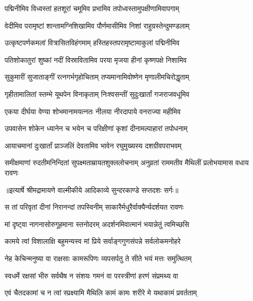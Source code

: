 \twolineshloka
{पद्मिनीमिव विध्वस्तां हतशूरां चमूमिव}
{प्रभामिव तपोध्वस्तामुपक्षीणामिवापगाम्} %

\twolineshloka
{वेदीमिव परामृष्टां शान्तामग्निशिखामिव}
{पौर्णमासीमिव निशां राहुग्रस्तेन्दुमण्डलाम्} %

\twolineshloka
{उत्कृष्टपर्णकमलां वित्रासितविहंगमाम्}
{हस्तिहस्तपरामृष्टामाकुलां पद्मिनीमिव} %

\twolineshloka
{पतिशोकातुरां शुष्कां नदीं विस्रावितामिव}
{परया मृजया हीनां कृष्णपक्षे निशामिव} %

\twolineshloka
{सुकुमारीं सुजाताङ्गीं रत्नगर्भगृहोचिताम्}
{तप्यमानामिवोष्णेन मृणालीमचिरोद्धृताम्} %

\twolineshloka
{गृहीतामालितां स्तम्भे यूथपेन विनाकृताम्}
{निःश्वसन्तीं सुदुःखार्तां गजराजवधूमिव} %

\twolineshloka
{एकया दीर्घया वेण्या शोभमानामयत्नतः}
{नीलया नीरदापाये वनराज्या महीमिव} %

\twolineshloka
{उपवासेन शोकेन ध्यानेन च भयेन च}
{परिक्षीणां कृशां दीनामल्पाहारां तपोधनाम्} %

\twolineshloka
{आयाचमानां दुःखार्तां प्राञ्जलिं देवतामिव}
{भावेन रघुमुख्यस्य दशग्रीवपराभवम्} %

\fourlineindentedshloka
{समीक्षमाणां रुदतीमनिन्दितां}
{ सुपक्ष्मताम्रायतशुक्ललोचनाम्}
{अनुव्रतां राममतीव मैथिलीं}
{ प्रलोभयामास वधाय रावणः} %


{॥इत्यार्षे श्रीमद्रामायणे वाल्मीकीये आदिकाव्ये सुन्दरकाण्डे सप्तदशः सर्गः॥}


\twolineshloka
{स तां परिवृतां दीनां निरानन्दां तपस्विनीम्}
{साकारैर्मधुरैर्वाक्यैर्न्यदर्शयत रावणः} %

\twolineshloka
{मां दृष्ट्वा नागनासोरुगूहमाना स्तनोदरम्}
{अदर्शनमिवात्मानं भयान्नेतुं त्वमिच्छसि} %

\twolineshloka
{कामये त्वां विशालाक्षि बहुमन्यस्व मां प्रिये}
{सर्वाङ्गगुणसंपन्ने सर्वलोकमनोहरे} %

\twolineshloka
{नेह केचिन्मनुष्या वा राक्षसाः कामरूपिणः}
{व्यपसर्पतु ते सीते भयं मत्तः समुत्थितम्} %

\twolineshloka
{स्वधर्मे रक्षसां भीरु सर्वथैष न संशयः}
{गमनं वा परस्त्रीणां हरणं संप्रमथ्य वा} %

\twolineshloka
{एवं चैतदकामां च न त्वां स्प्रक्ष्यामि मैथिलि}
{कामं कामः शरीरे मे यथाकामं प्रवर्तताम्} %

